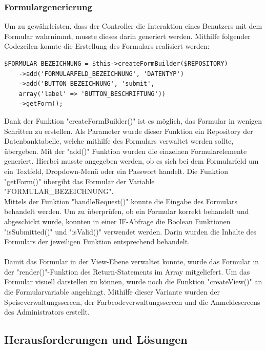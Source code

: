     \subsubsection{Formulargenerierung}

Um zu gewährleisten, dass der Controller die Interaktion eines Benutzers mit dem Formular wahrnimmt, musste dieses darin generiert werden. Mithilfe folgender Codezeilen konnte die Erstellung des Formulars realisiert werden:
	\lstset{language=php}
  	\begin{lstlisting}
$FORMULAR_BEZEICHNUNG = $this->createFormBuilder($REPOSITORY)
	->add('FORMULARFELD_BEZEICHNUNG', 'DATENTYP')
	->add('BUTTON_BEZEICHNUNG', 'submit', 
	array('label' => 'BUTTON_BESCHRIFTUNG'))
    ->getForm();
  	\end{lstlisting}
Dank der Funktion "createFormBuilder()" ist es möglich, das Formular in wenigen Schritten zu erstellen. Als Parameter wurde dieser Funktion ein Repository der Datenbanktabelle, welche mithilfe des Formulars verwaltet werden sollte, übergeben. Mit der "add()" Funktion wurden die einzelnen Formularelemente generiert. Hierbei musste angegeben werden, ob es sich bei dem Formularfeld um ein Textfeld, Dropdown-Menü oder ein Passwort handelt. Die Funktion "getForm()" übergibt das Formular der Variable "FORMULAR\_BEZEICHNUNG".
\\
Mittels der Funktion "handleRequest()" konnte die Eingabe des Formulars behandelt werden. Um zu überprüfen, ob ein Formular korrekt behandelt und abgeschickt wurde, konnten in einer IF-Abfrage die Boolean Funktionen "isSubmitted()" und "isValid()" verwendet werden.
Darin wurden die Inhalte des Formulars der jeweiligen Funktion entsprechend behandelt.
\\ \\
Damit das Formular in der View-Ebene verwaltet konnte, wurde das Formular in der "render()"-Funktion des Return-Statements im Array mitgeliefert.
Um das Formular visuell darstellen zu können, wurde noch die Funktion "createView()" an die Formularvariable angehängt.
Mithilfe dieser Variante wurden der Speiseverwaltungsscreen, der Farbcodeverwaltungsscreen und die Anmeldescreens des Administrators erstellt.

  \subsection{Herausforderungen und Lösungen}

